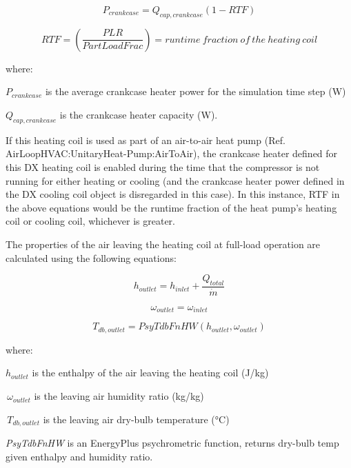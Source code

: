 \begin{equation}
  {P_{crankcase}} = {Q_{cap,crankcase}}\left( {1 - RTF} \right)
\end{equation}

\begin{equation}
RTF = \left( \frac{PLR}{PartLoadFrac} \right) = runtime~fraction~of~the~heating~coil
\end{equation}

where:

\({P_{crankcase}}\) is the average crankcase heater power for the simulation time step (W)

\({Q_{cap,crankcase}}\) is the crankcase heater capacity (W).

If this heating coil is used as part of an air-to-air heat pump (Ref. AirLoopHVAC:UnitaryHeat-Pump:AirToAir), the crankcase heater defined for this DX heating coil is enabled during the time that the compressor is not running for either heating or cooling (and the crankcase heater power defined in the DX cooling coil object is disregarded in this case). In this instance, RTF in the above equations would be the runtime fraction of the heat pump's heating coil or cooling coil, whichever is greater.

The properties of the air leaving the heating coil at full-load operation are calculated using the following equations:

\begin{equation}
  h_{outlet} = h_{inlet} + \frac{Q_{total}}{\dot{m}}
 \label{eq:SSEHPDXHeatingCoilhoutlet}
\end{equation}

\begin{equation}
{\omega_{outlet}} = {\omega_{inlet}}
\label{eq:SSEHPDXHeatingCoilomegaoutlet}
\end{equation}

\begin{equation}
{T_{db,outlet}} = PsyTdbFnHW({h_{outlet}},{\omega_{outlet}})
\label{eq:SSEHPDXHeatingCoilTdboutlet}
\end{equation}

where:

\({h_{outlet}}\) is the enthalpy of the air leaving the heating coil (J/kg)

\(\,{\omega_{outlet}}\) is the leaving air humidity ratio (kg/kg)

\(\,{T_{db,outlet}}\) is the leaving air dry-bulb temperature (°C)

\emph{PsyTdbFnHW} is an EnergyPlus psychrometric function, returns dry-bulb temp given enthalpy and humidity ratio.

